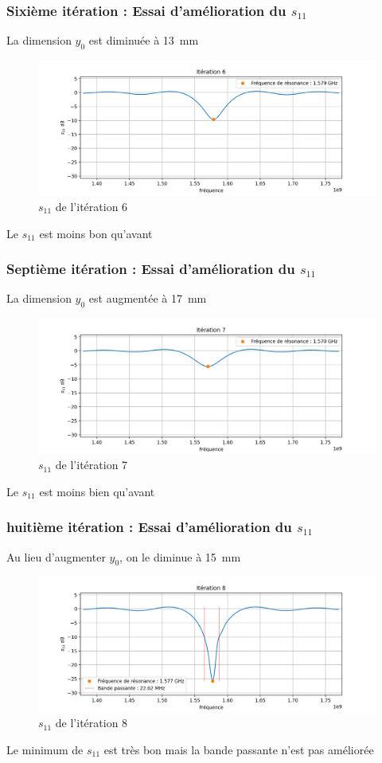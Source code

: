 \documentclass[Deriaz_Traiber_Labo02.tex]{subfiles}
\begin{document}
\subsubsection{Sixième itération : Essai d'amélioration du $s_{11}$}
La dimension $y_0$ est diminuée à \SI{13}{\milli\meter}
\begin{figure}[H]
\centering
\includegraphics[width=15cm]{../Calculs/run_id_ceramique_6.png}
\caption[caption]{$s_{11}$ de l'itération 6}
\end{figure}
Le $s_{11}$ est moins bon qu'avant
\subsubsection{Septième itération : Essai d'amélioration du $s_{11}$}
La dimension $y_0$ est augmentée à \SI{17}{\milli\meter}
\begin{figure}[H]
\centering
\includegraphics[width=15cm]{../Calculs/run_id_ceramique_7.png}
\caption[caption]{$s_{11}$ de l'itération 7}
\end{figure}
Le $s_{11}$ est moins bien qu'avant
\subsubsection{huitième itération : Essai d'amélioration du $s_{11}$}
Au lieu d'augmenter $y_0$, on le diminue à \SI{15}{\milli\meter}
\begin{figure}[H]
\centering
\includegraphics[width=15cm]{../Calculs/run_id_ceramique_8.png}
\caption[caption]{$s_{11}$ de l'itération 8}
\end{figure}
Le minimum de $s_{11}$ est très bon mais la bande passante n'est pas améliorée
\end{document}
